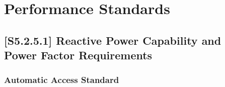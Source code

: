 \documentclass{../grid-link-report}
\newcommand{\projectassetsdir}{../project-assets}
\begin{document}
	
	
	\chapter{Performance Standards}
	\section{[S5.2.5.1] Reactive Power Capability and Power Factor Requirements}
	\label{sec:s5251}
	\subsection{Automatic Access Standard}
	\begin{tcolorbox}[lightgreenbox]
		
	\end{tcolorbox}
\end{document}
